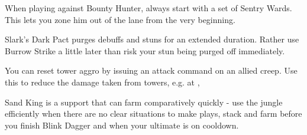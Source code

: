 {
\item When playing against Bounty Hunter, always start with a set of Sentry Wards. This lets you zone him out of the lane from the very beginning.
\item Slark's Dark Pact purges debuffs and stuns for an extended duration. Rather use Burrow Strike a little later than risk your stun being purged off immediately.
\item You can reset tower aggro by issuing an attack command on an allied creep. Use this to reduce the damage taken from towers, e.g. at , 
\item Sand King is a support that can farm comparatively quickly - use the jungle efficiently when there are no clear situations to make plays, stack and farm before you finish Blink Dagger and when your ultimate is on cooldown.
}

